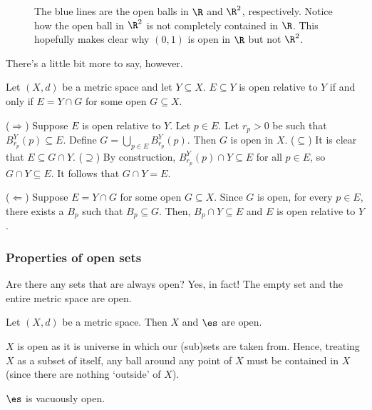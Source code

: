 \documentclass[class=article, crop=false]{standalone}
\begin{document}
\begin{figure}[ht]
    \centering
    \caption{The blue lines are the open balls in $\R$ and $\R^2$, respectively. Notice how the open ball in $\R^2$ is not completely contained in $\R$. This hopefully makes clear why $(0,1)$ is open in $\R$ but not $\R^2$.}
    \label{fig:01openinRbutnotinR2}
\end{figure}

There's a little bit more to say, however.

\begin{thm}{\label{thm:relativeopenness}}
    Let $(X,d)$ be a metric space and let $Y \subseteq X$. $E \subseteq Y$ is open relative to $Y$ if and only if $E = Y \cap G$ for some open $G \subseteq X$.
\end{thm}
\begin{pf}
($\Rightarrow$) Suppose $E$ is open relative to $Y$. Let $p \in E$. Let $r_p > 0$ be such that $B_{r_p}^Y(p) \subseteq E$. Define $G = \bigcup_{p \in E}^{} B_{r_p}^Y(p)$. Then $G$ is open in $X$. ($\subseteq$) It is clear that $E \subseteq G \cap Y$. ($\supseteq$) By construction, $B_{r_p}^Y(p) \cap Y \subseteq E$
for all $p \in E$, so $G \cap Y \subseteq E$. It follows that $G \cap Y = E$.

($\Leftarrow$) Suppose $E = Y \cap G$ for some open $G \subseteq X$. Since $G$ is open, for every $p \in E$, there exists a $B_p$ such that $B_p \subseteq G$. Then, $B_p \cap Y \subseteq E$ and $E$ is open relative to $Y$.
\end{pf}

\subsubsection*{Properties of open sets}

Are there any sets that are always open? Yes, in fact! The empty set and the entire metric space are open.
\begin{fact}{\label{fact: universal open sets}}
    Let $(X,d)$ be a metric space. Then $X$ and $\es$ are open.
\end{fact}
\begin{pf}
    $X$ is open as it is universe in which our (sub)sets are taken from. Hence, treating $X$ as a subset of itself, any ball around any point of $X$ must be contained in $X$ (since there are nothing `outside' of $X$).

    $\es$ is vacuously open.
\end{pf}
\end{document}

